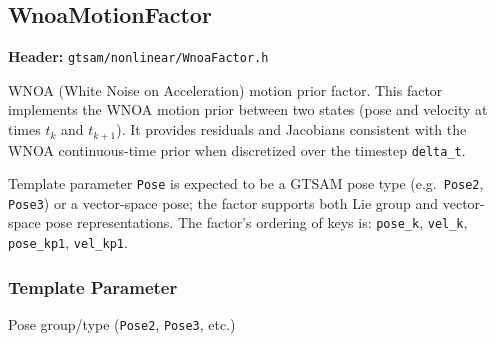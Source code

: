 \documentclass[11pt]{report}
\begin{document}
\newpage
\subsection*{WnoaMotionFactor}
\label{sec:api-wnoafactor}

\textbf{Header:} \texttt{gtsam/nonlinear/WnoaFactor.h}

\medskip\noindent
WNOA (White Noise on Acceleration) motion prior factor. This factor implements
the WNOA motion prior between two states (pose and velocity at times $t_k$ and
$t_{k+1}$). It provides residuals and Jacobians consistent with the WNOA
continuous-time prior when discretized over the timestep \texttt{delta\_t}.

Template parameter \texttt{Pose} is expected to be a GTSAM pose type (e.g.\
\texttt{Pose2}, \texttt{Pose3}) or a vector-space pose; the factor supports
both Lie group and vector-space pose representations. The factor's ordering of
keys is: \texttt{pose\_k}, \texttt{vel\_k}, \texttt{pose\_kp1}, \texttt{vel\_kp1}.

\subsubsection*{Template Parameter}
\begin{description}[style=nextline,leftmargin=2em]
	\item[\texttt{Pose}] Pose group/type (\texttt{Pose2}, \texttt{Pose3}, etc.)
\end{description}
\end{document}
